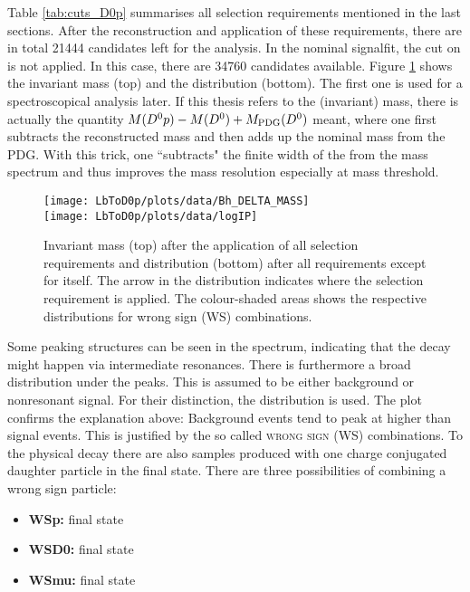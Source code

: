 Table \ref{tab:cuts_D0p} summarises all selection requirements mentioned in the last sections.
After the reconstruction and application of these requirements, there are in total 21444 \LbToDpmunuX candidates left for the analysis.
In the nominal signalfit, the cut on \logIP is not applied.
In this case, there are 34760 candidates available.
Figure \ref{fig:plot_mD0p_logIP} shows the invariant \Dz\proton mass (top) and the \logIP distribution (bottom). 
The first one is used for a spectroscopical analysis later.
If this thesis refers to the (invariant) \Dz\proton mass, there is actually the quantity $M({{D}^0}{p}) - M({{D}^0}) + M_\text{PDG}({{D}^0})$ meant, where one first subtracts the reconstructed \Dz mass and then adds up the nominal \Dz mass from the PDG.
With this trick, one ``subtracts" the finite width of the \Dz from the \Dz\proton mass spectrum and thus improves the mass resolution especially at \Dz\proton mass threshold.
\begin{figure}[tbp]
	\centering
	\texttt{[image: LbToD0p/plots/data/Bh\_DELTA\_MASS]} \\
	\texttt{[image: LbToD0p/plots/data/logIP]}
	\caption{Invariant \Dz\proton mass (top) after the application of all selection requirements and \logIP distribution (bottom) after all requirements except for \logIP itself.
             The arrow in the \logIP distribution indicates where the selection requirement is applied.
             The colour-shaded areas shows the respective distributions for wrong sign (WS) combinations.}
	\label{fig:plot_mD0p_logIP}
\end{figure}
Some peaking structures can be seen in the spectrum, indicating that the decay \LbToDpmunuX might happen via intermediate resonances.
There is furthermore a broad distribution under the peaks.
This is assumed to be either background or nonresonant signal.
For their distinction, the \logIP distribution is used.
The plot confirms the explanation above:
Background events tend to peak at higher \logIP than signal events. 
This is justified by the so called \textsc{wrong sign (WS)} combinations.
To the physical decay \LbToDpmunuX there are also samples produced with one charge conjugated daughter particle in the final state.
There are three possibilities of combining a wrong sign particle:
\begin{itemize}
    \item \textbf{WSp:} \Dz\antiproton\mun final state
    \item \textbf{WSD0:} \Dzb\proton\mun final state
    \item \textbf{WSmu:} \Dz\proton\mup final state
\end{itemize}
